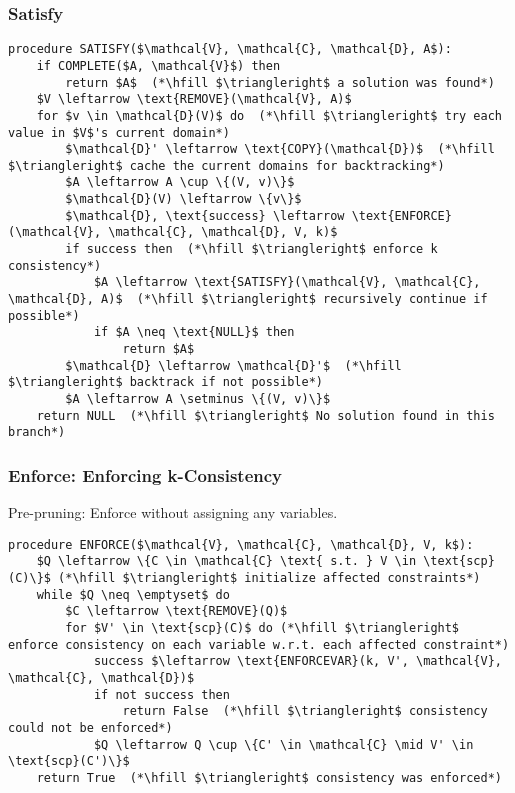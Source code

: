 \subsubsection{Satisfy}
\begin{algo}
\begin{lstlisting}
procedure SATISFY($\mathcal{V}, \mathcal{C}, \mathcal{D}, A$):
    if COMPLETE($A, \mathcal{V}$) then
        return $A$  (*\hfill $\triangleright$ a solution was found*)
    $V \leftarrow \text{REMOVE}(\mathcal{V}, A)$
    for $v \in \mathcal{D}(V)$ do  (*\hfill $\triangleright$ try each value in $V$'s current domain*)
        $\mathcal{D}' \leftarrow \text{COPY}(\mathcal{D})$  (*\hfill $\triangleright$ cache the current domains for backtracking*)
        $A \leftarrow A \cup \{(V, v)\}$
        $\mathcal{D}(V) \leftarrow \{v\}$
        $\mathcal{D}, \text{success} \leftarrow \text{ENFORCE}(\mathcal{V}, \mathcal{C}, \mathcal{D}, V, k)$
        if success then  (*\hfill $\triangleright$ enforce k consistency*)
            $A \leftarrow \text{SATISFY}(\mathcal{V}, \mathcal{C}, \mathcal{D}, A)$  (*\hfill $\triangleright$ recursively continue if possible*)
            if $A \neq \text{NULL}$ then
                return $A$
        $\mathcal{D} \leftarrow \mathcal{D}'$  (*\hfill $\triangleright$ backtrack if not possible*)
        $A \leftarrow A \setminus \{(V, v)\}$
    return NULL  (*\hfill $\triangleright$ No solution found in this branch*)
\end{lstlisting}
\end{algo}

\subsubsection{Enforce: Enforcing k-Consistency}
\begin{algo} Pre-pruning: Enforce without assigning any variables. 
\begin{lstlisting}
procedure ENFORCE($\mathcal{V}, \mathcal{C}, \mathcal{D}, V, k$):
    $Q \leftarrow \{C \in \mathcal{C} \text{ s.t. } V \in \text{scp}(C)\}$ (*\hfill $\triangleright$ initialize affected constraints*)
    while $Q \neq \emptyset$ do
        $C \leftarrow \text{REMOVE}(Q)$
        for $V' \in \text{scp}(C)$ do (*\hfill $\triangleright$ enforce consistency on each variable w.r.t. each affected constraint*)
            success $\leftarrow \text{ENFORCEVAR}(k, V', \mathcal{V}, \mathcal{C}, \mathcal{D})$
            if not success then
                return False  (*\hfill $\triangleright$ consistency could not be enforced*)
            $Q \leftarrow Q \cup \{C' \in \mathcal{C} \mid V' \in \text{scp}(C')\}$
    return True  (*\hfill $\triangleright$ consistency was enforced*)
\end{lstlisting}
\end{algo}

